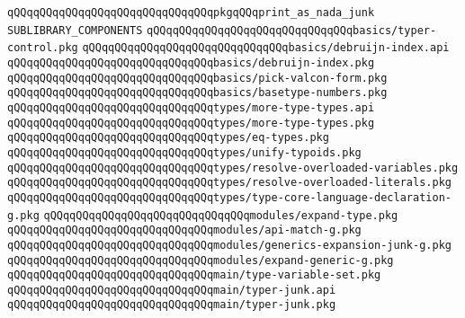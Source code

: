 \verb|qQQqqQQqqQQqqQQqqQQqqQQqqQQqqQQqpkgqQQqprint_as_nada_junk|\newline
\newline
\newline
\newline
\verb|SUBLIBRARY_COMPONENTS|\newline
\newline
\verb|qQQqqQQqqQQqqQQqqQQqqQQqqQQqqQQqbasics/typer-control.pkg|\newline
\verb|qQQqqQQqqQQqqQQqqQQqqQQqqQQqqQQqbasics/debruijn-index.api|\newline
\verb|qQQqqQQqqQQqqQQqqQQqqQQqqQQqqQQqbasics/debruijn-index.pkg|\newline
\verb|qQQqqQQqqQQqqQQqqQQqqQQqqQQqqQQqbasics/pick-valcon-form.pkg|\newline
\verb|qQQqqQQqqQQqqQQqqQQqqQQqqQQqqQQqbasics/basetype-numbers.pkg|\newline
\newline
\verb|qQQqqQQqqQQqqQQqqQQqqQQqqQQqqQQqtypes/more-type-types.api|\newline
\verb|qQQqqQQqqQQqqQQqqQQqqQQqqQQqqQQqtypes/more-type-types.pkg|\newline
\verb|qQQqqQQqqQQqqQQqqQQqqQQqqQQqqQQqtypes/eq-types.pkg|\newline
\verb|qQQqqQQqqQQqqQQqqQQqqQQqqQQqqQQqtypes/unify-typoids.pkg|\newline
\verb|qQQqqQQqqQQqqQQqqQQqqQQqqQQqqQQqtypes/resolve-overloaded-variables.pkg|\newline
\verb|qQQqqQQqqQQqqQQqqQQqqQQqqQQqqQQqtypes/resolve-overloaded-literals.pkg|\newline
\verb|qQQqqQQqqQQqqQQqqQQqqQQqqQQqqQQqtypes/type-core-language-declaration-g.pkg|\newline
\verb|qQQqqQQqqQQqqQQqqQQqqQQqqQQqqQQqmodules/expand-type.pkg|\newline
\verb|qQQqqQQqqQQqqQQqqQQqqQQqqQQqqQQqmodules/api-match-g.pkg|\newline
\verb|qQQqqQQqqQQqqQQqqQQqqQQqqQQqqQQqmodules/generics-expansion-junk-g.pkg|\newline
\verb|qQQqqQQqqQQqqQQqqQQqqQQqqQQqqQQqmodules/expand-generic-g.pkg|\newline
\newline
\verb|qQQqqQQqqQQqqQQqqQQqqQQqqQQqqQQqmain/type-variable-set.pkg|\newline
\verb|qQQqqQQqqQQqqQQqqQQqqQQqqQQqqQQqmain/typer-junk.api|\newline
\verb|qQQqqQQqqQQqqQQqqQQqqQQqqQQqqQQqmain/typer-junk.pkg|\newline
